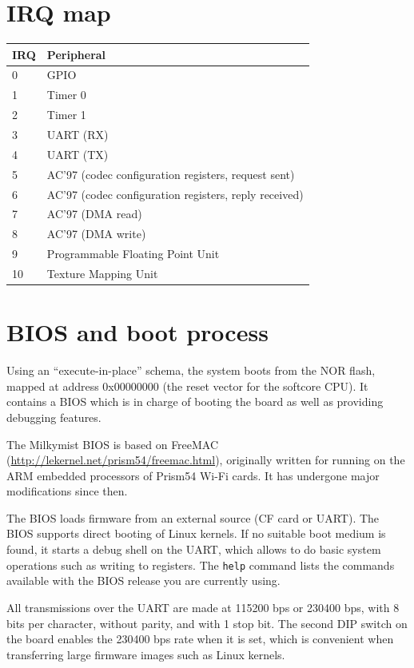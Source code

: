 \documentclass[a4paper,11pt]{article}
\begin{document}
\section{IRQ map}
\begin{tabularx}{\textwidth}{|l|X|}
\hline
\bf{IRQ} & \bf{Peripheral} \\
\hline
0 & GPIO \\
\hline
1 & Timer 0 \\
\hline
2 & Timer 1 \\
\hline
3 & UART (RX)\\
\hline
4 & UART (TX)\\
\hline
5 & AC'97 (codec configuration registers, request sent)\\
\hline
6 & AC'97 (codec configuration registers, reply received)\\
\hline
7 & AC'97 (DMA read)\\
\hline
8 & AC'97 (DMA write)\\
\hline
9 & Programmable Floating Point Unit\\
\hline
10 & Texture Mapping Unit\\
\hline
\end{tabularx}

\section{BIOS and boot process}
Using an ``execute-in-place'' schema, the system boots from the NOR flash, mapped at address 0x00000000 (the reset vector for the softcore CPU). It contains a BIOS which is in charge of booting the board as well as providing debugging features.

The Milkymist BIOS is based on FreeMAC (\url{http://lekernel.net/prism54/freemac.html}), originally written for running on the ARM embedded processors of Prism54 Wi-Fi cards. It has undergone major modifications since then.

The BIOS loads firmware from an external source (CF card or UART). The BIOS supports direct booting of Linux kernels. If no suitable boot medium is found, it starts a debug shell on the UART, which allows to do basic system operations such as writing to registers. The \verb!help! command lists the commands available with the BIOS release you are currently using.

All transmissions over the UART are made at 115200 bps or 230400 bps, with 8 bits per character, without parity, and with 1 stop bit. The second DIP switch on the board enables the 230400 bps rate when it is set, which is convenient when transferring large firmware images such as Linux kernels.
\end{document}
